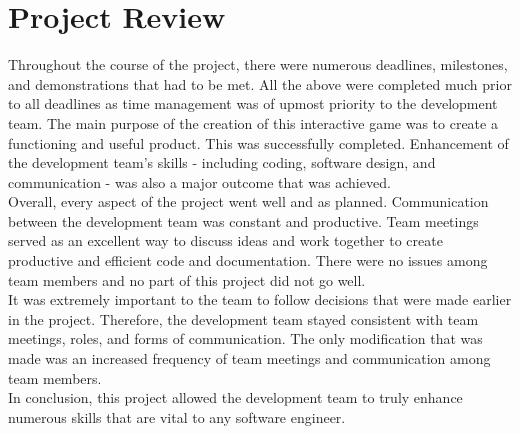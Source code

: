 \documentclass{article}
\begin{document}
\section{Project Review}

Throughout the course of the project, there were numerous deadlines, milestones, and demonstrations that had to be met. All the above were completed much prior to all deadlines as time management was of upmost priority to the development team. The main purpose of the creation of this interactive game was to create a functioning and useful product. This was successfully completed. Enhancement of the development team's skills - including coding, software design, and communication -  was also a major outcome that was achieved. \\

\indent Overall, every aspect of the project went well and as planned. Communication between the development team was constant and productive. Team meetings served as an excellent way to discuss ideas and work together to create productive and efficient code and documentation. There were no issues among team members and no part of this project did not go well.\\

\indent It was extremely important to the team to follow decisions that were made earlier in the project. Therefore, the development team stayed consistent with team meetings, roles, and forms of communication. The only modification that was made was an increased frequency of team meetings and communication among team members.  \\

\indent In conclusion, this project allowed the development team to truly enhance numerous skills that are vital to any software engineer. 
\end{document}
